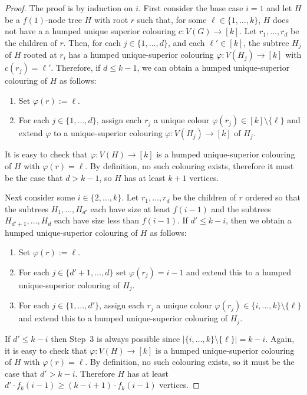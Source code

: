 \documentclass[kpfonts]{patmorin}
\begin{document}
\begin{proof}
    The proof is by induction on $i$. First consider the base case $i=1$ and let $H$ be a $f(1)$-node tree $H$ with root $r$ such that, for some $\ell\in\{1,\ldots,k\}$, $H$ does not have a a humped unique superior colouring $c:V(G)\to [k]$.  Let $r_1,\ldots,r_d$ be the children of $r$.
    Then, for each $j\in\{1,\ldots,d\}$, and each $\ell'\in[k]$, the subtree $H_j$ of $H$ rooted at $r_i$ has a humped unique-superior colouring $\varphi:V(H_j)\to[k]$ with $c(r_j)=\ell'$.  Therefore, if $d \le k-1$, we can obtain a humped unique-superior colouring of $H$ as follows:
    \begin{enumerate}
        \item Set $\varphi(r):=\ell$.
        \item For each $j\in\{1,\ldots,d\}$, assign each $r_j$ a unique colour  $\varphi(r_j)\in[k]\setminus\{\ell\}$ and extend $\varphi$ to a unique-superior colouring $\varphi:V(H_j)\to [k]$ of $H_j$.
    \end{enumerate}
    It is easy to check that $\varphi:V(H)\to[k]$ is a humped unique-superior colouring of $H$ with $\varphi(r)=\ell$.  By definition, no such colouring exists, therefore it must be the case that $d> k-1$, so $H$ has at least $k+1$ vertices.

    Next consider some $i\in\{2,\ldots,k\}$.  Let $r_1,\ldots,r_d$ be the children of $r$ ordered so that the subtrees $H_1,\ldots,H_{d'}$ each have size at least $f(i-1)$ and the subtrees $H_{d'+1},\ldots,H_d$ each have size less than $f(i-1)$.  If $d'\le k-i$, then we obtain a humped unique-superior colouring of $H$ as follows:
    \begin{enumerate}
        \item Set $\varphi(r):=\ell$.
        \item For each $j\in\{d'+1,\ldots,d\}$ set $\varphi(r_j)=i-1$ and extend this to a humped unique-superior colouring of $H_j$.
        \item For each $j\in\{1,\ldots,d'\}$, assign each $r_j$ a unique colour $\varphi(r_j)\in\{i,\ldots,k\}\setminus\{\ell\}$ and extend this to a humped unique-superior colouring of $H_j$.
    \end{enumerate}
    If $d'\le k-i$ then Step~3 is always possible since $|\{i,\ldots,k\}\setminus\{\ell\}|=k-i$. Again, it is easy to check that $\varphi:V(H)\to[k]$ is a humped unique-superior colouring of $H$ with $\varphi(r)=\ell$.  By definition, no such colouring exists, so it must be the case that $d'>k-i$. Therefore $H$ has at least $d'\cdot f_k(i-1)\ge (k-i+1)\cdot f_k(i-1)$ vertices.
\end{proof}
\end{document}
